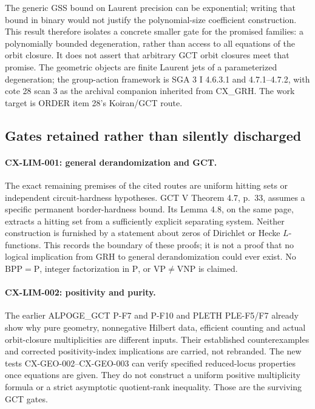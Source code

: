 The generic GSS bound on Laurent precision can be exponential; writing
that bound in binary would not justify the polynomial-size coefficient
construction. This result therefore isolates a concrete smaller gate for
the promised families: a polynomially bounded degeneration, rather than
access to all equations of the orbit closure. It does not assert that
arbitrary GCT orbit closures meet that promise. The geometric objects are
finite Laurent jets of a parameterized degeneration; the group-action
framework is SGA 3 I 4.6.3.1 and 4.7.1--4.7.2, with cote 28 scan 3 as the
archival companion inherited from CX\_GRH. The work target is ORDER item
28's Koiran/GCT route.

\subsection{Gates retained rather than silently discharged}

\paragraph{CX-LIM-001: general derandomization and GCT.}
The exact remaining premises of the cited routes are uniform hitting sets
or independent circuit-hardness hypotheses. GCT V Theorem 4.7, p.~33,
assumes a specific permanent border-hardness bound. Its Lemma 4.8, on the
same page, extracts a hitting set from a sufficiently explicit separating
system. Neither construction is furnished by a statement about zeros of
Dirichlet or Hecke $L$-functions. This records the boundary of these proofs;
it is not a proof that no logical implication from GRH to general
derandomization could ever exist. No $\mathrm{BPP}=\mathrm P$, integer
factorization in $\mathrm P$, or $\mathrm{VP}\ne\mathrm{VNP}$ is claimed.

\paragraph{CX-LIM-002: positivity and purity.}
The earlier ALPOGE\_GCT P-F7 and P-F10 and PLETH PLE-F5/F7 already show
why pure geometry, nonnegative Hilbert data, efficient counting and actual
orbit-closure multiplicities are different inputs. Their established
counterexamples and corrected positivity-index implications are carried,
not rebranded. The new tests CX-GEO-002--CX-GEO-003 can verify specified
reduced-locus properties once equations are given. They do not construct a
uniform positive multiplicity formula or a strict asymptotic quotient-rank
inequality. Those are the surviving GCT gates.


